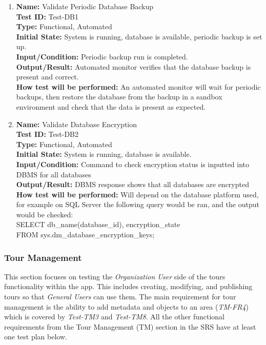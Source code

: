 \documentclass[12pt, titlepage]{article}
\begin{document}
\begin{enumerate}

  \item \textbf{Name:} Validate Periodic Database Backup \label{itm:Test-DB1} \\
        \textbf{Test ID:} Test-DB1 \\
        \textbf{Type:} Functional, Automated \\
        \textbf{Initial State:} System is running, database is available, periodic backup is set up. \\
        \textbf{Input/Condition:} Periodic backup run is completed.  \\
        \textbf{Output/Result:} Automated monitor verifies that the database backup is present and correct.  \\
        \textbf{How test will be performed:} An automated monitor will wait for periodic backups, then restore the database from the backup in a sandbox environment and check that the data is present as expected.

  \item \textbf{Name:} Validate Database Encryption \label{itm:Test-DB2} \\
        \textbf{Test ID:} Test-DB2 \\
        \textbf{Type:} Functional, Automated \\
        \textbf{Initial State:} System is running, database is available. \\
        \textbf{Input/Condition:} Command to check encryption status is inputted into DBMS for all databases \\
        \textbf{Output/Result:} DBMS response shows that all databases are encrypted \\
        \textbf{How test will be performed:} Will depend on the database platform used, for example on SQL Server the following query would be ran, and the output would be checked: \\
        SELECT db\_name(database\_id), encryption\_state \\
        FROM sys.dm\_database\_encryption\_keys;

\end{enumerate}

\subsubsection{Tour Management}

This section focuses on testing the \textit{Organization User} side of the tours functionality within the app. This includes creating, modifying, and publishing tours so that \textit{General Users} can use them. The main requirement for tour management is the ability to add metadata and objects to an area (\textit{TM-FR4}) which is covered by \textit{Test-TM3} and \textit{Test-TM8}. All the other functional requirements from the Tour Management (TM) section in the SRS \cite{SRS} have at least one test plan below.
\end{document}
